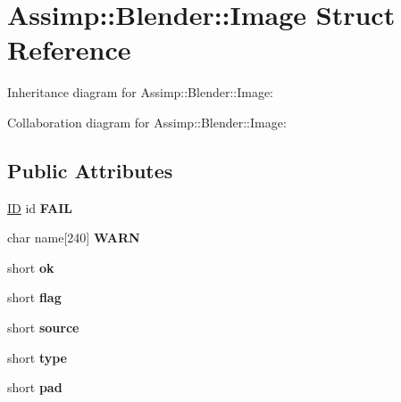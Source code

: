 \hypertarget{struct_assimp_1_1_blender_1_1_image}{\section{Assimp\+:\+:Blender\+:\+:Image Struct Reference}
\label{struct_assimp_1_1_blender_1_1_image}
}


Inheritance diagram for Assimp\+:\+:Blender\+:\+:Image\+:


Collaboration diagram for Assimp\+:\+:Blender\+:\+:Image\+:
\subsection*{Public Attributes}
\begin{DoxyCompactItemize}
\item 
\hypertarget{struct_assimp_1_1_blender_1_1_image_a8b086421548125d18e5108c4999a472d}{\hyperlink{struct_assimp_1_1_blender_1_1_i_d}{I\+D} id {\bfseries F\+A\+I\+L}}\label{struct_assimp_1_1_blender_1_1_image_a8b086421548125d18e5108c4999a472d}

\item 
\hypertarget{struct_assimp_1_1_blender_1_1_image_a8ecb03a50e0be44f0f85dcb4577719de}{char name\mbox{[}240\mbox{]} {\bfseries W\+A\+R\+N}}\label{struct_assimp_1_1_blender_1_1_image_a8ecb03a50e0be44f0f85dcb4577719de}

\item 
\hypertarget{struct_assimp_1_1_blender_1_1_image_a15c1bde365cc2f7a65d696bd7fcf4bb4}{short {\bfseries ok}}\label{struct_assimp_1_1_blender_1_1_image_a15c1bde365cc2f7a65d696bd7fcf4bb4}

\item 
\hypertarget{struct_assimp_1_1_blender_1_1_image_a24b9c87d74ee220252c6180fddb7f6b2}{short {\bfseries flag}}\label{struct_assimp_1_1_blender_1_1_image_a24b9c87d74ee220252c6180fddb7f6b2}

\item 
\hypertarget{struct_assimp_1_1_blender_1_1_image_aa5ea61030ef4acc76fee35daa61e8edc}{short {\bfseries source}}\label{struct_assimp_1_1_blender_1_1_image_aa5ea61030ef4acc76fee35daa61e8edc}

\item 
\hypertarget{struct_assimp_1_1_blender_1_1_image_adc713178629bd2894edfd95849f9863a}{short {\bfseries type}}\label{struct_assimp_1_1_blender_1_1_image_adc713178629bd2894edfd95849f9863a}

\item 
\hypertarget{struct_assimp_1_1_blender_1_1_image_a64a41071b76a379a5a266df1db09838c}{short {\bfseries pad}}\label{struct_assimp_1_1_blender_1_1_image_a64a41071b76a379a5a266df1db09838c}


\end{DoxyCompactItemize}
